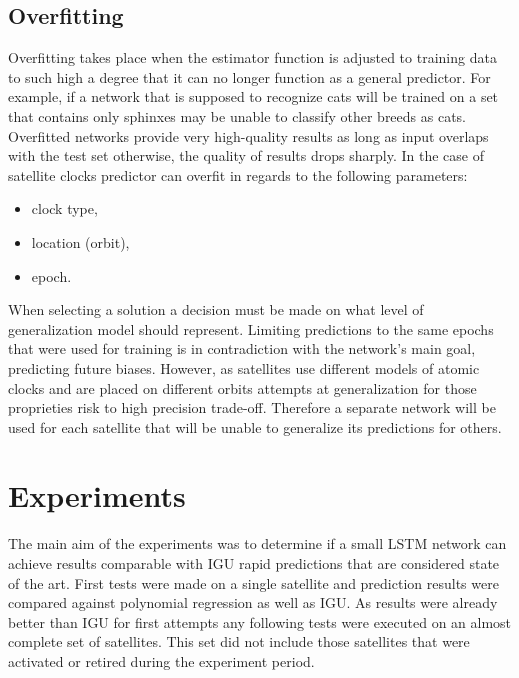 \documentclass{article}
\begin{document}
\subsection{Overfitting}  
Overfitting takes place when the estimator function is adjusted to training data to such high
a degree that it can no longer function as a general predictor.
For example, if a network that is supposed to recognize cats will be trained on a set that contains
only sphinxes may be unable to classify other breeds as cats.
Overfitted networks provide very high-quality results as long as input overlaps with the test set
otherwise, the quality of results drops sharply.
In the case of satellite clocks predictor can overfit in regards to the following parameters:
\begin{itemize}
\item clock type,
\item location (orbit),
\item epoch.
\end{itemize}
When selecting a solution a decision must be made on what level of generalization model should
represent. Limiting predictions to the same epochs that were used for training is in contradiction
with the network's main goal, predicting future biases. However, as satellites use different models
of atomic clocks and are placed on different orbits attempts at generalization for those
proprieties risk to high precision trade-off.
Therefore a separate network will be used for each satellite that will be unable to generalize
its predictions for others.

\FloatBarrier
\section{Experiments}
The main aim of the experiments was to determine if a small LSTM network can achieve results comparable with IGU rapid predictions that are considered state of the art.
First tests were made on a single satellite and prediction results were compared against polynomial regression as well as IGU. As results were already better than IGU for first attempts
any following tests were executed on an almost complete set of satellites. This set did not include
those satellites that were activated or retired during the experiment period.

\end{document}
